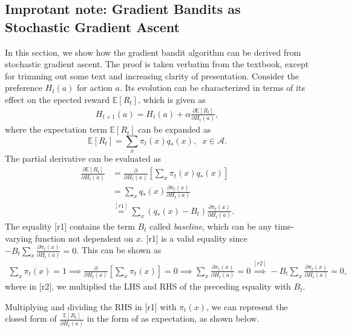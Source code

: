 \documentclass[10pt]{article}
\begin{document}
	\subsection*{Improtant note: Gradient Bandits as Stochastic Gradient Ascent}
	\label{ss:gb-sga}
	In this section, we show how the gradient bandit algorithm can be derived from stochastic gradient ascent. The proof is taken verbatim from the textbook, except for trimming out some text and increasing clarity of presentation. Consider the preference $H_t(a)$ for action $a$. Its evolution can be characterized in terms of its effect on the epected reward $\mathbb{E}[R_t]$, which is given as
	\begin{align*}
	H_{t+1}(a) = H_t(a) + \alpha \frac{  \partial \mathbb{E} [R_t]}{\partial H_t(a)},
	\end{align*}
	where the expectation term $\mathbb{E} [R_t]$ can be expanded as
	\begin{equation*}
	\mathbb{E} [R_t] = \sum_{x} \pi_t(x) q_{*}(x), \;\; x\in\mathcal{A}.
	\end{equation*} 
	The partial derivative can be evaluated as
	\begin{align*}
	\frac{\partial \mathbb{E}[R_t]}{\partial H_t(a)} &= \frac{\partial}{\partial H_t(a)} \left[ \sum_{x} \pi_t(x)q_{*}(x) \right]\\
	&= \sum_{x} q_{*} (x) \frac{\partial \pi_t(x)}{\partial H_t(a)}\\
	&\stackrel{[r1]}{=} \sum_{x} (q_{*}(x) - B_t) \frac{\partial \pi_t(x)}{\partial H_t(a)}.
	\end{align*}
	The equality [r1] contains the term $B_t$ called \emph{baseline}, which can be any time-varying function not dependent on $x$. [r1] is a valid equality since $-B_t\sum_{x} \frac{\partial \pi_t(x)}{\partial H_t(a)} = 0$. This can be shown as
	\begin{align*}
	\sum_{x} \pi_t(x) = 1 \implies \frac{\partial}{\partial H_t(a)} \left[ \sum_{x} \pi_t(x) \right] = 0 \implies \sum_{x} \frac{\partial \pi_t(x)}{\partial H_t(a)} = 0 \stackrel{[r2]}{\implies} -B_t\sum_{x} \frac{\partial \pi_t(x)}{\partial H_t(a)} = 0,
	\end{align*}
	where in [r2], we multiplied the LHS and RHS of the preceding equality with $B_t$. \par\noindent
	Multiplying and dividing the RHS in [r1] with $\pi_t(x)$, we can represent the closed form of $\frac{\mathbb{E}[R_t]}{\partial H_t(a)}$ in the form of as expectation, as shown below.
\end{document}
